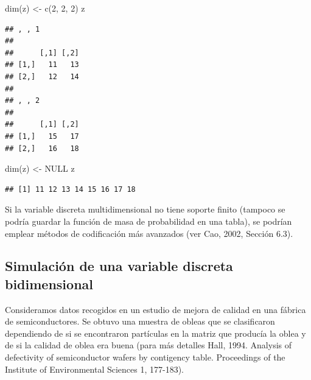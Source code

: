 \documentclass[
]{book}
\newenvironment{Shaded}{\begin{snugshade}}{\end{snugshade}}
\newcommand{\ConstantTok}[1]{\textcolor[rgb]{0.00,0.00,0.00}{#1}}
\newcommand{\DecValTok}[1]{\textcolor[rgb]{0.00,0.00,0.81}{#1}}
\newcommand{\FunctionTok}[1]{\textcolor[rgb]{0.00,0.00,0.00}{#1}}
\newcommand{\NormalTok}[1]{#1}
\newcommand{\OtherTok}[1]{\textcolor[rgb]{0.56,0.35,0.01}{#1}}
\theoremstyle{break}
\theoremstyle{definition}
\theoremstyle{definition}
\theoremstyle{definition}
\theoremstyle{definition}
\theoremstyle{remark}
\begin{document}
\begin{Shaded}
\begin{Highlighting}[]
\FunctionTok{dim}\NormalTok{(z) }\OtherTok{\textless{}{-}} \FunctionTok{c}\NormalTok{(}\DecValTok{2}\NormalTok{, }\DecValTok{2}\NormalTok{, }\DecValTok{2}\NormalTok{)}
\NormalTok{z}
\end{Highlighting}
\end{Shaded}

\begin{verbatim}
## , , 1
## 
##      [,1] [,2]
## [1,]   11   13
## [2,]   12   14
## 
## , , 2
## 
##      [,1] [,2]
## [1,]   15   17
## [2,]   16   18
\end{verbatim}

\begin{Shaded}
\begin{Highlighting}[]
\FunctionTok{dim}\NormalTok{(z) }\OtherTok{\textless{}{-}} \ConstantTok{NULL}
\NormalTok{z}
\end{Highlighting}
\end{Shaded}

\begin{verbatim}
## [1] 11 12 13 14 15 16 17 18
\end{verbatim}

Si la variable discreta multidimensional no tiene soporte finito (tampoco se podría guardar la función de masa de probabilidad en una tabla), se podrían emplear métodos de codificación más avanzados (ver Cao, 2002, Sección 6.3).

\hypertarget{simulaciuxf3n-de-una-variable-discreta-bidimensional}{%
\subsection{Simulación de una variable discreta bidimensional}\label{simulaciuxf3n-de-una-variable-discreta-bidimensional}}

Consideramos datos recogidos en un estudio de mejora de calidad en una fábrica de semiconductores.
Se obtuvo una muestra de obleas que se clasificaron dependiendo de si se encontraron partículas en la matriz que producía la oblea y de si la calidad de oblea era buena (para más detalles Hall, 1994. Analysis of defectivity of semiconductor wafers by contigency table. Proceedings of the Institute of Environmental Sciences 1, 177-183).
\end{document}
